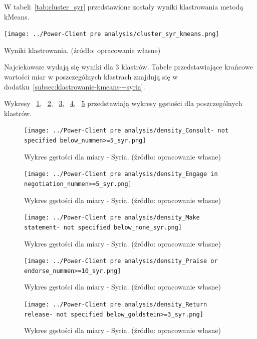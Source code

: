 \documentclass[11pt]{report}
\begin{document}
    W tabeli~\ref{tab:cluster_syr} przedstawione zostały wyniki klastrowania metodą kMeans.
    \begin{table}[!htp]
        \centering
        \texttt{[image: ../Power-Client pre analysis/cluster\_syr\_kmeans.png]}
        \caption{Wyniki klastrowania. (źródło: opracowanie własne)}
        \label{tab:cluster_syr}
    \end{table}

    Najciekawsze wydają się wyniki dla 3 klastrów.
    Tabele przedstawiające krańcowe wartości miar w poszczególnych klastrach znajdują się w dodatku~\ref{subsec:klastrowanie-kmeans---syria}.

    Wykresy
    ~\ref{fig:density_Consult- not specified below_nummen>=5_syr},
    ~\ref{fig:density_Engage in negotiation_nummen>=5_syr},
    ~\ref{fig:density_Make statement- not specified below_none_syr},
    ~\ref{fig:density_Praise or endorse_nummen>=10_syr},
    ~\ref{fig:density_Return release- not specified below_goldstein>=3_syr}
    przedstawiają wykresy gęstości dla poszczególnych klastrów.

    \begin{figure}[!htp]
        \centering
        \texttt{[image: ../Power-Client pre analysis/density\_Consult- not specified below\_nummen>=5\_syr.png]}
        \caption{Wykres gęstości dla miary - Syria. (źródło: opracowanie własne)}
        \label{fig:density_Consult- not specified below_nummen>=5_syr}
    \end{figure}
    \begin{figure}[!htp]
        \centering
        \texttt{[image: ../Power-Client pre analysis/density\_Engage in negotiation\_nummen>=5\_syr.png]}
        \caption{Wykres gęstości dla miary - Syria. (źródło: opracowanie własne)}
        \label{fig:density_Engage in negotiation_nummen>=5_syr}
    \end{figure}
    \begin{figure}[!htp]
        \centering
        \texttt{[image: ../Power-Client pre analysis/density\_Make statement- not specified below\_none\_syr.png]}
        \caption{Wykres gęstości dla miary - Syria. (źródło: opracowanie własne)}
        \label{fig:density_Make statement- not specified below_none_syr}
    \end{figure}
    \begin{figure}[!htp]
        \centering
        \texttt{[image: ../Power-Client pre analysis/density\_Praise or endorse\_nummen>=10\_syr.png]}
        \caption{Wykres gęstości dla miary - Syria. (źródło: opracowanie własne)}
        \label{fig:density_Praise or endorse_nummen>=10_syr}
    \end{figure}
    \begin{figure}[!htp]
        \centering
        \texttt{[image: ../Power-Client pre analysis/density\_Return release- not specified below\_goldstein>=3\_syr.png]}
        \caption{Wykres gęstości dla miary - Syria. (źródło: opracowanie własne)}
        \label{fig:density_Return release- not specified below_goldstein>=3_syr}
    \end{figure}
\end{document}
